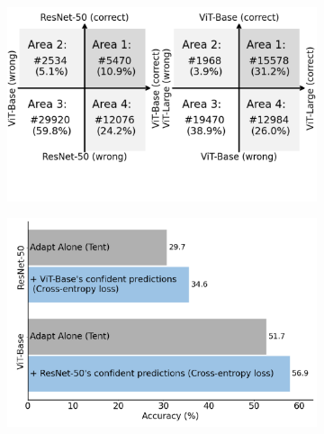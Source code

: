 \begin{figure}[t]
\centering
\begin{subfigure}[t]{0.33\textwidth} 
    \centering
\includegraphics[width=\linewidth]{sec/fig1a_2.pdf}
    \label{fig1a}
\end{subfigure}
\hfill
\begin{subfigure}[t]{0.34\textwidth}
    \centering
    \includegraphics[width=\linewidth]{sec/fig1b_2.pdf}
    \label{fig1b}
\end{subfigure}
\hfill
\begin{subfigure}[t]{0.32\textwidth}
    \centering

\end{subfigure}
\end{figure}
